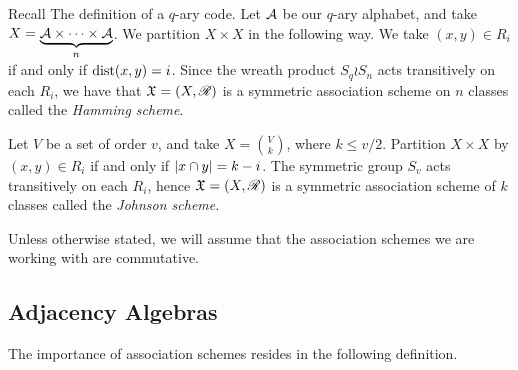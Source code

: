\documentclass[../../../main]{subfiles}
\begin{document}
 \begin{ex}
  Recall The definition of a $q$-ary code. Let $\mathcal{A}$ be our $q$-ary alphabet, and take $X = \underbrace{\mathcal{A} \times \cdots \times \mathcal{A}}_n$. We partition $X \times X$ in the following way. We take $(x,y) \in R_i$ if and only if $\text{dist}(x,y)=i$. Since the wreath product $S_q \wr S_n$ acts transitively on each $R_i$, we have that $\mathfrak{X}=(X,\mathscr{R})$ is a symmetric association scheme on $n$ classes called the {\it Hamming scheme}.
 \end{ex}
 
 \begin{ex}
  Let $V$ be a set of order $v$, and take $X=\binom{V}{k}$, where $k \leq v/2$. Partition $X \times X$ by $(x,y) \in R_i$ if and only if $|x \cap y|=k-i$. The symmetric group $S_v$ acts transitively on each $R_i$, hence $\mathfrak{X}=(X,\mathscr{R})$ is a symmetric association scheme of $k$ classes called the {\it Johnson scheme}.
 \end{ex}
 
 Unless otherwise stated, we will assume that the association schemes we are working with are commutative. 
 
 \dinkus

 \subsection{Adjacency Algebras}
 
 The importance of association schemes resides in the following definition.
 
\end{document}
